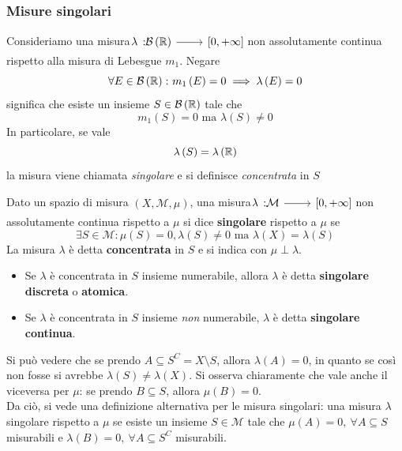 \subsubsection{Misure singolari}
Consideriamo una misura $\funz{\lambda}{\mathcal{B}\left(\realset\right)}{\left[0,+\infty\right]}$ non assolutamente continua rispetto alla misura di Lebesgue $m_1$.
Negare
\begin{equation*}
	\forall E\in\mathcal{B}\left(\mathbb{R}\right)\colon m_1\left(E\right)=0\implies \lambda\left(E\right)=0
\end{equation*}
significa che esiste un insieme $S\in\mathcal{B}\left(\mathbb{R}\right)$ tale che
\begin{equation*}
	m_1\left(S\right)=0\text{ ma }\lambda\left(S\right)\neq 0
\end{equation*}
In particolare, se vale
\begin{equation*}
	\lambda\left(S\right)=\lambda\left(\mathbb{R}\right)
\end{equation*}
la misura viene chiamata \textit{singolare} e si definisce \textit{concentrata} in $S$
\begin{define}
	Dato un spazio di misura $\left(X,\mathcal{M},\mu\right)$, una misura $\funz{\lambda}{\mathcal{M}}{\left[0,+\infty\right]}$ non assolutamente continua rispetto a $\mu$ si dice \textbf{singolare} rispetto a $\mu$ se
	\begin{equation}
		\exists S\in\mathcal{M}\colon \mu\left(S\right)=0, \lambda\left(S\right)\neq0 \text{ ma }\lambda\left(X\right)=\lambda\left(S\right)
	\end{equation}
La misura $\lambda$ è detta \textbf{concentrata} in $S$ e si indica con $\mu\perp\lambda$.
\begin{itemize}
	\item Se $\lambda$ è concentrata in $S$ insieme numerabile, allora $\lambda$ è detta \textbf{singolare discreta} o \textbf{atomica}.
	\item Se $\lambda$ è concentrata in $S$ insieme \textit{non} numerabile, $\lambda$ è detta \textbf{singolare continua}.
\end{itemize}
\end{define}
\begin{observe}
Si può vedere che se prendo $A\subseteq S^{C}=X\setminus S$, allora $\lambda\left(A\right)=0$, in quanto se così non fosse si avrebbe $\lambda\left(S\right)\neq\lambda\left(X\right)$. Si osserva chiaramente che vale anche il viceversa per $\mu$: se prendo $B\subseteq S$, allora $\mu\left(B\right)=0$.\\
Da ciò, si vede una definizione alternativa per le misura singolari: una misura $\lambda$ singolare rispetto a $\mu$ se esiste un insieme $S\in\mathcal{M}$ tale che $\mu\left(A\right)=0,\ \forall A\subseteq S$ misurabili e $\lambda\left(B\right)=0,\ \forall A\subseteq S^{C}$ misurabili.
\end{observe}
